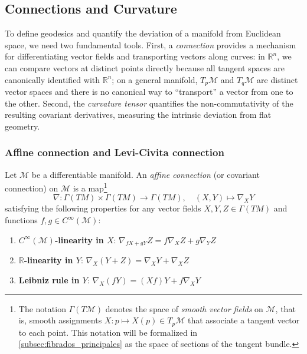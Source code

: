 \subsection{Connections and Curvature}\label{subsec:conexiones_curvatura}

To define geodesics and quantify the deviation of a manifold from Euclidean space, we need two fundamental tools. First, a \textit{connection} provides a mechanism for differentiating vector fields and transporting vectors along curves: in $\mathbb{R}^n$, we can compare vectors at distinct points directly because all tangent spaces are canonically identified with $\mathbb{R}^n$; on a general manifold, $T_p\mathcal{M}$ and $T_q\mathcal{M}$ are distinct vector spaces and there is no canonical way to ``transport'' a vector from one to the other. Second, the \textit{curvature tensor} quantifies the non-commutativity of the resulting covariant derivatives, measuring the intrinsic deviation from flat geometry.

\subsubsection{Affine connection and Levi-Civita connection}\label{subsec:conexion_levi_civita}

\begin{definition}\label{def:conexion_afin}
Let $\mathcal{M}$ be a differentiable manifold. An \textit{affine connection} (or covariant connection) on $\mathcal{M}$ is a map\footnote{The notation $\Gamma(T\mathcal{M})$ denotes the space of \textit{smooth vector fields} on $\mathcal{M}$, that is, smooth assignments $X\colon p \mapsto X(p) \in T_p\mathcal{M}$ that associate a tangent vector to each point. This notation will be formalized in \autoref{subsec:fibrados_principales} as the space of sections of the tangent bundle.}
\[
\nabla: \Gamma(TM) \times \Gamma(TM) \to \Gamma(TM), \quad (X, Y) \mapsto \nabla_X Y
\]
satisfying the following properties for any vector fields $X, Y, Z \in \Gamma(TM)$ and functions $f, g \in C^\infty(\mathcal{M})$:
\begin{enumerate}
	\item \textbf{$C^\infty(\mathcal{M})$-linearity in $X$}: $\nabla_{fX + gY} Z = f\nabla_X Z + g\nabla_Y Z$
	\item \textbf{$\mathbb{R}$-linearity in $Y$}: $\nabla_X(Y + Z) = \nabla_X Y + \nabla_X Z$
	\item \textbf{Leibniz rule in $Y$}: $\nabla_X(fY) = (Xf)Y + f\nabla_X Y$
\end{enumerate}
\end{definition}

